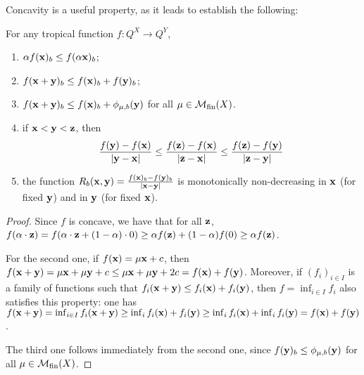Concavity is a useful property, as it leads to establish the following:
\begin{proposition}
For any tropical function $f: Q^{X}\to Q^{Y}$, 
\begin{enumerate}
\item $ \alpha f(\mathbf{x})_{b}\leq  f(\alpha\mathbf{x})_{b}$;
\item $f(\mathbf{x}+\mathbf{y})_{b}\leq f(\mathbf{x})_{b}+f(\mathbf{y})_{b}$;
\item $f(\mathbf{x}+\mathbf{y})_{b} \leq f(\mathbf{x})_{b} + \phi_{\mu,b}(\mathbf{y})$ 
for all $\mu\in \mathcal{M}_{\mathrm{fin}}(X)$.

\item if $\mathbf{x} < \mathbf{y} < \mathbf{z}$, then 
$$
\frac{f(\mathbf{y})-f(\mathbf{x})}{|\mathbf{y}-\mathbf{x}|} \leq \frac{f(\mathbf{z})-f(\mathbf{x})}{|\mathbf{z}-\mathbf{x}|}
\leq \frac{f(\mathbf{z})-f(\mathbf{y})}{|\mathbf{z}-\mathbf{y}|}
$$

\item the function $R_{b}(\mathbf{x}, \mathbf{y})= \frac{f(\mathbf{x})_{b}-f(\mathbf{y})_{b}}{| \mathbf{x}- \mathbf{y}|}$ is monotonically non-decreasing in $\mathbf{x}$ (for fixed $\mathbf{y}$) and in $\mathbf{y}$ (for fixed $\mathbf{x}$).

\end{enumerate}
\end{proposition}
\begin{proof}
Since $f$ is concave, we have that for all $\mathbf{z}$, 
$f(\alpha\cdot\mathbf{z})=f(\alpha\cdot\mathbf{z}+(1-\alpha)\cdot 0)\geq 
\alpha f(\mathbf{z})+(1-\alpha)f(0)\geq \alpha f(\mathbf{z})$. 

For the second one, 
if $f(\mathbf{x})=\mu \mathbf{x}+c$, then $f(\mathbf{x}+\mathbf{y})= \mu \mathbf{x}+ \mu \mathbf{y} + c  \leq
\mu \mathbf{x} + \mu \mathbf{y} + 2c = f(\mathbf{x})+f(\mathbf{y})$.
Moreover, if $(f_{i})_{i\in I}$ is a family of functions such that $f_{i}(\mathbf{x}+\mathbf{y})\leq f_{i}(\mathbf{x})+f_{i}(\mathbf{y})$, then 
$f=\inf _{i\in I}f_{i}$ also satisfies this property: 
one has $f(\mathbf{x}+\mathbf{y})=\inf_{i\in I}f_{i}(\mathbf{x}+\mathbf{y}) \geq \inf_{i} f_{i}(\mathbf{x})+f_{i}(\mathbf{y}) \geq \inf_{i}f_{i}(\mathbf{x}) + \inf_{i}f_{i}(\mathbf{y})=f(\mathbf{x})+f(\mathbf{y})$.
%

The third one follows immediately from the second one, since $f(\mathbf{y})_{b}\leq \phi_{\mu,b}(\mathbf{y})$ for all $\mu\in \mathcal{M}_{\mathrm{fin}}(X)$.













\end{proof}

